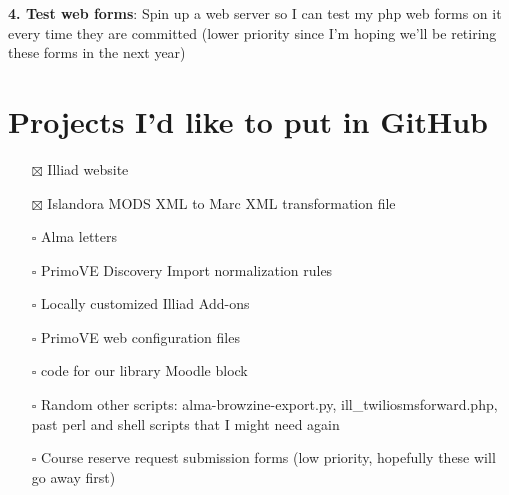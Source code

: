 \documentclass[
  openany]{book}
\providecommand{\tightlist}{%
  \setlength{\itemsep}{0pt}\setlength{\parskip}{0pt}}
\begin{document}
\textbf{4. Test web forms}: Spin up a web server so I can test my php web forms on it every time they are committed (lower priority since I'm hoping we'll be retiring these forms in the next year)

\hypertarget{projects-id-like-to-put-in-github}{%
\chapter{Projects I'd like to put in GitHub}\label{projects-id-like-to-put-in-github}}

\begin{itemize}
\tightlist
\item[$\boxtimes$]
  Illiad website
\item[$\boxtimes$]
  Islandora MODS XML to Marc XML transformation file
\item[$\square$]
  Alma letters
\item[$\square$]
  PrimoVE Discovery Import normalization rules
\item[$\square$]
  Locally customized Illiad Add-ons
\item[$\square$]
  PrimoVE web configuration files
\item[$\square$]
  code for our library Moodle block
\item[$\square$]
  Random other scripts: alma-browzine-export.py, ill\_twiliosmsforward.php, past perl and shell scripts that I might need again
\item[$\square$]
  Course reserve request submission forms (low priority, hopefully these will go away first)
\end{itemize}
\end{document}
